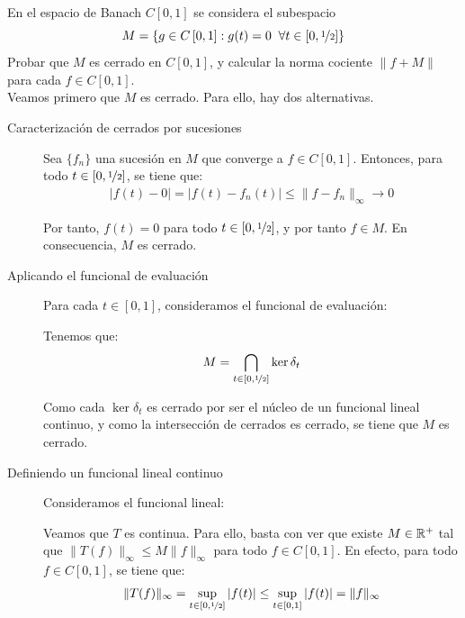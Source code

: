 \begin{ejercicio}
En el espacio de Banach $C\left[0, 1\right]$ se considera el subespacio
\[
M = \left\{g \in C\left[0, 1\right] : g(t) = 0 \;\; \forall t \in \left[0, \nicefrac{1}{2}\right]\right\}
\]
Probar que $M$ es cerrado en $C\left[0, 1\right]$, y calcular la norma cociente $\|f + M\|$ para cada $f \in C\left[0, 1\right]$.\\

Veamos primero que $M$ es cerrado. Para ello, hay dos alternativas.
\begin{description}
    \item[Caracterización de cerrados por sucesiones]
    
    Sea $\{f_n\}$ una sucesión en $M$ que converge a $f \in C[0, 1]$. Entonces, para todo $t \in [0, \nicefrac{1}{2}]$, se tiene que:
    \begin{align*}
        |f(t) - 0| = |f(t) - f_n(t)| \leq \|f - f_n\|_\infty \longrightarrow 0
    \end{align*}

    Por tanto, $f(t) = 0$ para todo $t \in [0, \nicefrac{1}{2}]$, y por tanto $f \in M$. En consecuencia, $M$ es cerrado.
    \item[Aplicando el funcional de evaluación]
    
    Para cada $t \in [0, 1]$, consideramos el funcional de evaluación:

    Tenemos que:
    \begin{align*}
        M = \bigcap\limits_{t \in [0, \nicefrac{1}{2}]} \ker \delta_t
    \end{align*}

    Como cada $\ker \delta_t$ es cerrado por ser el núcleo de un funcional lineal continuo, y como la intersección de cerrados es cerrado, se tiene que $M$ es cerrado.

    \item[Definiendo un funcional lineal continuo]
    
    Consideramos el funcional lineal:

    Veamos que $T$ es continua. Para ello, basta con ver que existe $M \in \mathbb{R}^+$ tal que $\|T(f)\|_\infty \leq M \|f\|_\infty$ para todo $f \in C[0, 1]$. En efecto, para todo $f \in C[0, 1]$, se tiene que:
    \begin{align*}
        \|T(f)\|_\infty = \sup\limits_{t \in [0, \nicefrac{1}{2}]} |f(t)| \leq \sup\limits_{t \in [0, 1]} |f(t)| = \|f\|_\infty
    \end{align*}


\end{description}
\end{ejercicio}
